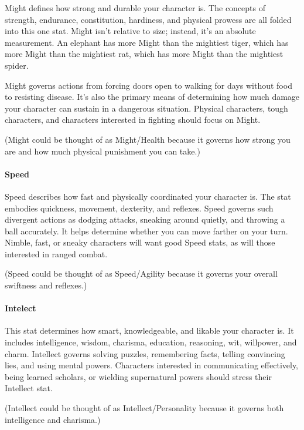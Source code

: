 \begin{multicols}{2}
Might defines how strong and durable your character is. The concepts of strength, endurance, constitution, hardiness, and physical prowess are all folded into this one stat. Might isn’t relative to size; instead, it’s an absolute measurement. An elephant has more Might than the mightiest tiger, which has more Might than the mightiest rat, which has more Might than the mightiest spider.

Might governs actions from forcing doors open to walking for days without food to resisting disease. It’s also the primary means of determining how much damage your character can sustain in a dangerous situation. Physical characters, tough characters, and characters interested in fighting should focus on Might.

(Might could be thought of as Might/Health because it governs how strong you are and how much physical punishment you can take.)

\paragraph{Speed}

Speed describes how fast and physically coordinated your character is. The stat embodies quickness, movement, dexterity, and reflexes. Speed governs such divergent actions as dodging attacks, sneaking around quietly, and throwing a ball accurately. It helps determine whether you can move farther on your turn. Nimble, fast, or sneaky characters will want good Speed stats, as will those interested in ranged combat.

(Speed could be thought of as Speed/Agility because it governs your overall swiftness and reflexes.)

\paragraph{Intelect}

This stat determines how smart, knowledgeable, and likable your character is. It includes intelligence, wisdom, charisma, education, reasoning, wit, willpower, and charm. Intellect governs solving puzzles, remembering facts, telling convincing lies, and using mental powers. Characters interested in communicating effectively, being learned scholars, or wielding supernatural powers should stress their Intellect stat.

(Intellect could be thought of as Intellect/Personality because it governs both intelligence and charisma.)


\end{multicols}
